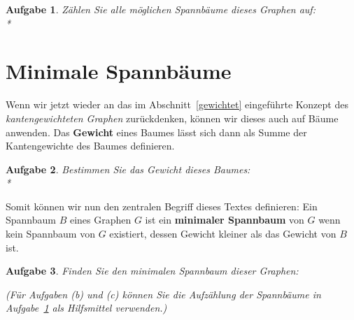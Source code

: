 \documentclass[12pt,a4paper]{report}
\theoremstyle{break}
\newtheorem{exercise}{Aufgabe}[chapter]
\theoremstyle{plain}
\begin{document}
\begin{exercise}\label{exspan}
Z\"{a}hlen Sie alle m\"{o}glichen Spannb\"{a}ume dieses Graphen auf:\\*
\end{exercise}

\newpage
\section{Minimale Spannb\"{a}ume}

Wenn wir jetzt wieder an das im Abschnitt~\ref{gewichtet}
eingef\"{u}hrte Konzept des \emph{kantengewichteten Graphen}
zur\"{u}ckdenken, k\"{o}nnen wir dieses auch auf B\"{a}ume
anwenden. Das \textbf{Gewicht} eines Baumes l\"{a}sst sich dann als
Summe der Kantengewichte des Baumes definieren.

\begin{exercise}\label{exgewicht}
Bestimmen Sie das Gewicht dieses Baumes:\\*
\nopagebreak{}
\end{exercise}

Somit k\"{o}nnen wir nun den zentralen Begriff dieses Textes
definieren: Ein Spannbaum $B$ eines Graphen $G$ ist ein
\textbf{minimaler Spannbaum} von $G$ wenn kein Spannbaum von $G$
existiert, dessen Gewicht kleiner als das Gewicht von $B$ ist.

\begin{exercise}\label{exspangewicht}
Finden Sie den minimalen Spannbaum dieser Graphen:

\begin{figure}[h!]
\begin{subfigure}[b]{0.3\textwidth}
\caption{}
\end{subfigure}
\begin{subfigure}[b]{0.3\textwidth}
\caption{}
\end{subfigure}
\begin{subfigure}[b]{0.3\textwidth}
\caption{}
\end{subfigure}
\end{figure}

(F\"{u}r Aufgaben (b) und (c) k\"{o}nnen Sie die Aufz\"{a}hlung der
Spannb\"{a}ume in Aufgabe~\ref{exspan} als Hilfsmittel verwenden.)
\end{exercise}
\end{document}
